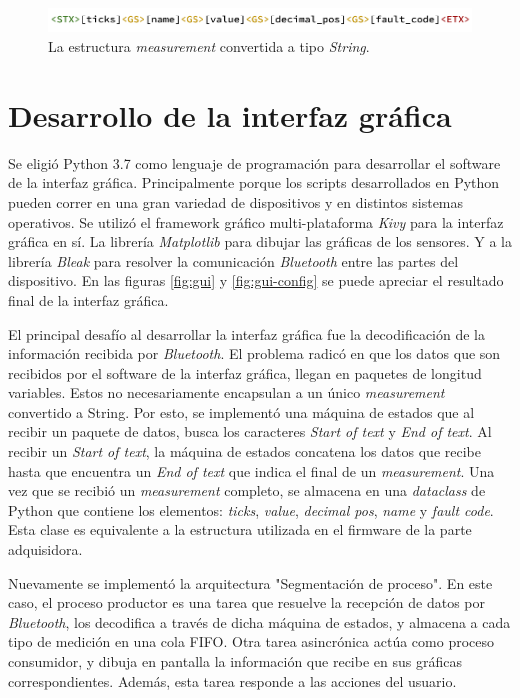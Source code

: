 \begin{figure}[htpb]
\centering
\includegraphics[width=.9\textwidth]{./Figures/measurement-string.png}
\caption{La estructura \textit{measurement} convertida a tipo \textit{String}.}
\label{fig:measurement-string}
\end{figure}


\section{Desarrollo de la interfaz gráfica}

Se eligió Python 3.7 como lenguaje de programación para desarrollar el software de la interfaz gráfica. Principalmente porque los scripts desarrollados en Python pueden correr en una gran variedad de dispositivos y en distintos sistemas operativos. Se utilizó el framework gráfico multi-plataforma \textit{Kivy} para la interfaz gráfica en sí. La librería \textit{Matplotlib} para dibujar las gráficas de los sensores. Y a la librería \textit{Bleak} para resolver la comunicación \textit{Bluetooth} entre las partes del dispositivo. En las figuras \ref{fig:gui} y \ref{fig:gui-config} se puede apreciar el resultado final de la interfaz gráfica.

El principal desafío al desarrollar la interfaz gráfica fue la decodificación de la información recibida por \textit{Bluetooth}. 
El problema radicó en que los datos que son recibidos por el software de la interfaz gráfica, llegan en paquetes de longitud variables. Estos no necesariamente encapsulan a un único \textit{measurement} convertido a String. Por esto, se implementó una máquina de estados que al recibir un paquete de datos, busca los caracteres \textit{Start of text} y \textit{End of text}. Al recibir un \textit{Start of text}, la máquina de estados concatena los datos que recibe hasta que encuentra un \textit{End of text} que indica el final de un \textit{measurement}. Una vez que se recibió un \textit{measurement} completo, se almacena en una \textit{dataclass} de Python que contiene los elementos: \textit{ticks}, \textit{value}, \textit{decimal pos}, \textit{name} y \textit{fault code}. Esta clase es equivalente a la estructura utilizada en el firmware de la parte adquisidora.

Nuevamente se implementó la arquitectura "Segmentación de proceso". En este caso, el proceso productor es una tarea que resuelve la recepción de datos por \textit{Bluetooth}, los decodifica a través de dicha máquina de estados, y almacena a cada tipo de medición en una cola FIFO. Otra tarea asincrónica actúa como proceso consumidor, y dibuja en pantalla la información que recibe en sus gráficas correspondientes. Además, esta tarea responde a las acciones del usuario.

